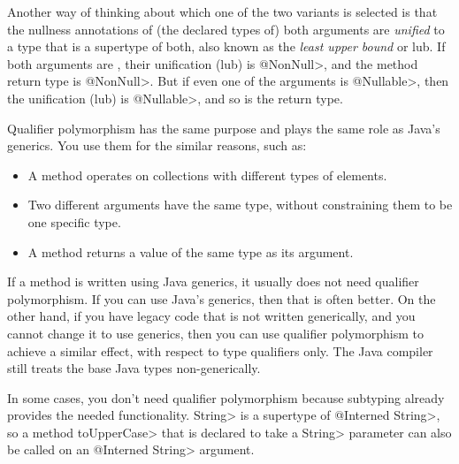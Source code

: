 Another way of thinking about which one of the two  variants is
selected is that the nullness annotations of (the declared types of) both
arguments are \emph{unified} to a type that is a supertype of both, also
known as the \emph{least upper bound} or lub.  If both
arguments are , their unification (lub) is \<@NonNull>, and the
method return type is \<@NonNull>.  But if even one of the arguments is \<@Nullable>,
then the unification (lub) is \<@Nullable>, and so is the return type.




Qualifier polymorphism has the same purpose and plays the same role as
Java's generics.  You use them for the similar reasons, such as:
\begin{itemize}
\item
  A method operates on collections with different types of
  elements.
\item
  Two different arguments have the same type, without constraining them to
  be one specific type.
\item
  A method returns a value of the same type as its argument.
\end{itemize}


If a method is written using Java generics, it usually does not need
qualifier polymorphism.  If you can use Java's generics, then that is often
better.  On the other hand, if you have legacy code that is not
written generically, and you cannot change it to use generics, then you can
use qualifier polymorphism to achieve a similar effect, with respect to
type qualifiers only.  The Java compiler still treats the base Java types
non-generically.

In some cases, you don't need qualifier polymorphism because subtyping
already provides the needed functionality.
\<String> is a supertype of \<@Interned String>, so a method \<toUpperCase>
that is declared to take a \<String> parameter can also be called on an
\<@Interned String> argument.

